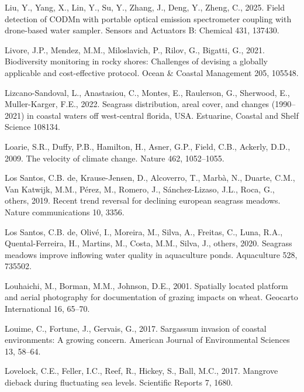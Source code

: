 \documentclass[
  letterpaper,
  11pt,
  english,
  singlespacing,
  headsepline]{MastersDoctoralThesis}
\newlength{\cslhangindent}
\newenvironment{CSLReferences}[2] %
 {\begin{list}{}{%
  \setlength{\itemindent}{0pt}
  \setlength{\leftmargin}{0pt}
  \setlength{\parsep}{0pt}
  \ifodd #1
   \setlength{\leftmargin}{\cslhangindent}
   \setlength{\itemindent}{-1\cslhangindent}
  \fi
  \setlength{\itemsep}{#2\baselineskip}}}
 {\end{list}}
\begin{document}
\begin{CSLReferences}{1}{0}
Liu, Y., Yang, X., Lin, Y., Su, Y., Zhang, J., Deng, Y., Zheng, C.,
2025. Field detection of CODMn with portable optical emission
spectrometer coupling with drone-based water sampler. Sensors and
Actuators B: Chemical 431, 137430.

Livore, J.P., Mendez, M.M., Miloslavich, P., Rilov, G., Bigatti, G.,
2021. Biodiversity monitoring in rocky shores: Challenges of devising a
globally applicable and cost-effective protocol. Ocean \& Coastal
Management 205, 105548.

Lizcano-Sandoval, L., Anastasiou, C., Montes, E., Raulerson, G.,
Sherwood, E., Muller-Karger, F.E., 2022. Seagrass distribution, areal
cover, and changes (1990--2021) in coastal waters off west-central
florida, USA. Estuarine, Coastal and Shelf Science 108134.

Loarie, S.R., Duffy, P.B., Hamilton, H., Asner, G.P., Field, C.B.,
Ackerly, D.D., 2009. The velocity of climate change. Nature 462,
1052--1055.

Los Santos, C.B. de, Krause-Jensen, D., Alcoverro, T., Marbà, N.,
Duarte, C.M., Van Katwijk, M.M., Pérez, M., Romero, J., Sánchez-Lizaso,
J.L., Roca, G., others, 2019. Recent trend reversal for declining
european seagrass meadows. Nature communications 10, 3356.

Los Santos, C.B. de, Olivé, I., Moreira, M., Silva, A., Freitas, C.,
Luna, R.A., Quental-Ferreira, H., Martins, M., Costa, M.M., Silva, J.,
others, 2020. Seagrass meadows improve inflowing water quality in
aquaculture ponds. Aquaculture 528, 735502.

Louhaichi, M., Borman, M.M., Johnson, D.E., 2001. Spatially located
platform and aerial photography for documentation of grazing impacts on
wheat. Geocarto International 16, 65--70.

Louime, C., Fortune, J., Gervais, G., 2017. Sargassum invasion of
coastal environments: A growing concern. American Journal of
Environmental Sciences 13, 58--64.

Lovelock, C.E., Feller, I.C., Reef, R., Hickey, S., Ball, M.C., 2017.
Mangrove dieback during fluctuating sea levels. Scientific Reports 7,
1680.


\end{CSLReferences}
\end{document}
